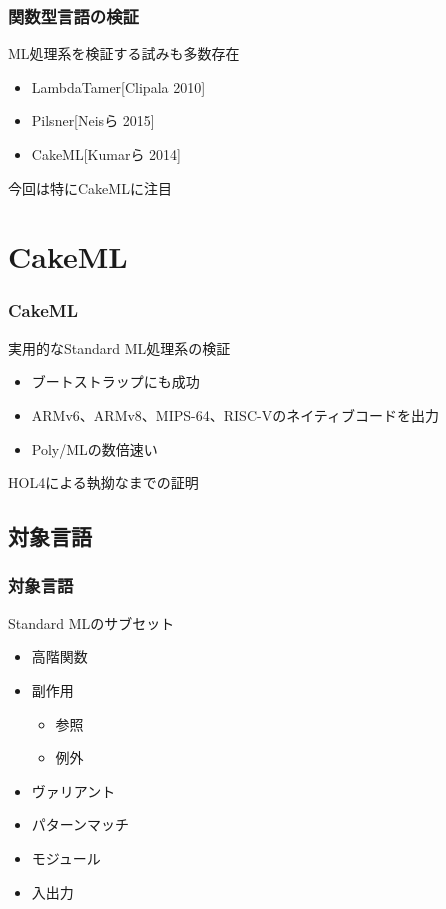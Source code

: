 \documentclass[dvipdfmx,cjk,xcolor=dvipsnames,envcountsect,notheorems,12pt]{beamer}
\theoremstyle{definition}
\begin{document}
\begin{frame}
	\frametitle{関数型言語の検証}
	\Large
	ML処理系を検証する試みも多数存在

	\begin{itemize}
		\item LambdaTamer[Clipala 2010]
		\item Pilsner[Neisら 2015]
		\item CakeML[Kumarら 2014]
	\end{itemize}

	\vfill

	今回は特にCakeMLに注目
\end{frame}

\section{CakeML}
\begin{frame}
	\frametitle{CakeML}
	\Large
	実用的なStandard ML処理系の検証
	\begin{itemize}
		\item ブートストラップにも成功
		\item ARMv6、ARMv8、MIPS-64、RISC-Vのネイティブコードを出力
		\item Poly/MLの数倍速い
	\end{itemize}

	HOL4による執拗なまでの証明
\end{frame}

\subsection{対象言語}

\begin{frame}
	\frametitle{対象言語}
	\Large
	Standard MLのサブセット
	\begin{itemize}
		\item 高階関数
		\item 副作用
			\begin{itemize}
				\item 参照
				\item 例外
			\end{itemize}
		\item ヴァリアント
		\item パターンマッチ
		\item モジュール
		\item 入出力
	\end{itemize}
\end{frame}
\end{document}
